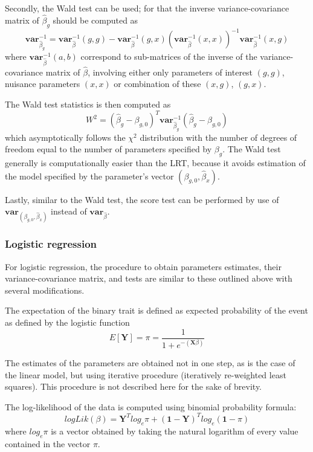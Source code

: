 \documentclass[12pt]{article}
\begin{document}
Secondly, the Wald test can be used; for that the inverse variance-covariance
matrix of $\hat{\beta}_g$ should be computed as 
$$
\mathbf{var}_{\hat{\beta}_g}^{-1} = \mathbf{var}_{\hat{\beta}}^{-1}(g,g) - 
\mathbf{var}_{\hat{\beta}}^{-1}(g,x) (\mathbf{var}_{\hat{\beta}}^{-1}(x,x))^{-1} \mathbf{var}_{\hat{\beta}}^{-1}(x,g)
$$
where $\mathbf{var}_{\hat{\beta}}^{-1}(a,b)$ correspond to sub-matrices of the inverse of the 
variance-covariance matrix of $\hat{\beta}$, involving either only parameters of interest 
$(g,g)$, nuisance parameters $(x,x)$ or combination of these $(x,g)$, $(g,x)$.

The Wald test statistics is then computed as 
$$
W^2 = (\hat{\beta}_g - \beta_{g,0})^T \mathbf{var}_{\hat{\beta}_g}^{-1} (\hat{\beta}_g - \beta_{g,0})
$$
which asymptotically follows the $\chi^2$ distribution with the number of degrees 
of freedom equal to the number of parameters specified by $\beta_g$. The Wald test generally 
is computationally easier than the LRT, because it avoids estimation of the model 
specified by the parameter's vector $(\beta_{g,0},\hat{\beta}_x)$.

Lastly, similar to the Wald test, the score test can be performed by use 
of $\mathbf{var}_{(\beta_{g,0},\hat{\beta}_x)}$ instead of $\mathbf{var}_{\hat{\beta}}$.


\subsubsection{Logistic regression}

For logistic regression, the procedure to obtain 
parameters estimates, their variance-covariance matrix, and tests are 
similar to these outlined above with several modifications. 

The expectation of the binary trait is defined as expected 
probability of the event as defined by the logistic 
function 
$$
E[\mathbf{Y}] = \pi = \frac{ 1 }{ 1 + e^{-(\mathbf{X}\beta)} }
$$

The estimates of the parameters are obtained not in one 
step, as is the case of the linear model, but using iterative 
procedure (iteratively re-weighted least squares). This 
procedure is not described here for the sake of brevity. 

The log-likelihood of the data is computed using 
binomial probability formula:
$$
logLik(\beta) = \mathbf{Y}^T log_e \pi + (\mathbf{1} - \mathbf{Y})^T log_e (\mathbf{1}-\pi)
$$
where $log_e \pi$ is a vector obtained by taking the natural logarithm of every 
value contained in the vector $\pi$. 
\end{document}
